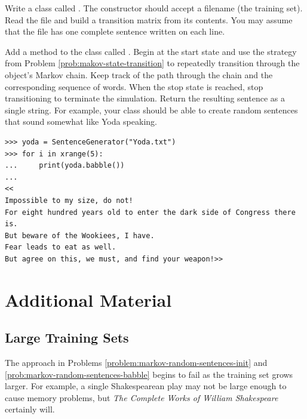 \begin{problem} %
Write a class called .
The constructor should accept a filename (the training set).
Read the file and build a transition matrix from its contents.
You may assume that the file has one complete sentence written on each line.
\label{problem:markov-random-sentences-init}
\end{problem}

\begin{problem} %
Add a method to the  class called .
Begin at the start state and use the strategy from Problem \ref{prob:makov-state-transition} to repeatedly transition through the object's Markov chain.
Keep track of the path through the chain and the corresponding sequence of words.
When the stop state is reached, stop transitioning to terminate the simulation.
Return the resulting sentence as a single string.
\newpage
For example, your  class should be able to create random sentences that sound somewhat like Yoda speaking.

\begin{lstlisting}
>>> yoda = SentenceGenerator("Yoda.txt")
>>> for i in xrange(5):
... 	print(yoda.babble())
...
<<
Impossible to my size, do not!
For eight hundred years old to enter the dark side of Congress there is.
But beware of the Wookiees, I have.
Fear leads to eat as well.
But agree on this, we must, and find your weapon!>>
\end{lstlisting}

\label{prob:markov-random-sentences-babble}
\end{problem}

\newpage

\section*{Additional Material} %

\subsection*{Large Training Sets} %

The approach in Problems \ref{problem:markov-random-sentences-init} and \ref{prob:markov-random-sentences-babble} begins to fail as the training set grows larger.
For example, a single Shakespearean play may not be large enough to cause memory problems, but \emph{The Complete Works of William Shakespeare} certainly will.

